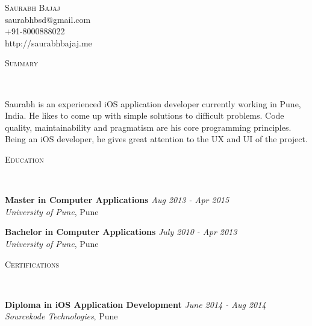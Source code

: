 \documentclass[9pt]{article}
\newenvironment{changemargin}[2]{%
  \begin{list}{}{%
    \setlength{\topsep}{0pt}%
    \setlength{\leftmargin}{#1}%
    \setlength{\rightmargin}{#2}%
    \setlength{\listparindent}{\parindent}%
    \setlength{\itemindent}{\parindent}%
    \setlength{\parsep}{\parskip}%
  }%
  \item[]}{\end{list}
}
\newcommand{\lineover}{
    \begin{changemargin}{-0.05in}{-0.05in}
        \vspace*{-8pt}
        \hrulefill \\
        \vspace*{-2pt}
    \end{changemargin}
}
\newcommand{\header}[1]{
    \begin{changemargin}{-0.5in}{-0.5in}
        \scshape{#1}\\
    \lineover
    \end{changemargin}
}
\newcommand{\contact}[4]{
    \begin{changemargin}{-0.5in}{-0.5in}
        \begin{center}
            {\Large \scshape {#1}}\\ \smallskip
            {#2}\\ \smallskip
            {#3}\\ \smallskip
            {#4}\smallskip
        \end{center}
    \end{changemargin}
}
\newenvironment{body} {
    \vspace*{-16pt}
    \begin{changemargin}{-0.25in}{-0.5in}
  }
    {\end{changemargin}
}
\begin{document}
\contact{Saurabh Bajaj}{saurabhbsd@gmail.com}{+91-8000888022}{http://saurabhbajaj.me}


\header{Summary}

\begin{body}
    \vspace{14pt}
  Saurabh is an experienced iOS application developer currently working in Pune, India. 
  He likes to come up with simple solutions to difficult problems. 
  Code quality, maintainability and pragmatism are his core programming principles.
  Being an iOS developer, he gives great attention to the UX and UI of the project.

\end{body}

\smallskip


\header{Education}

\begin{body}
    \vspace{14pt}
    \textbf{Master in Computer Applications}{} \hfill \emph{Aug 2013 - Apr 2015}{} \\
    \emph{University of Pune}, Pune{} \\
\end{body}

\begin{body}
    \vspace{14pt}
    \textbf{Bachelor in Computer Applications}{} \hfill \emph{July 2010 - Apr 2013}{} \\
    \emph{University of Pune}, Pune{} \\
\end{body}

\smallskip


\header{Certifications}

\begin{body}
    \vspace{14pt}
    \textbf{Diploma in iOS Application Development}{} \hfill \emph{June 2014 - Aug 2014}{} \\
    \emph{Sourcekode Technologies}, Pune{} \\
\end{body}

\smallskip
\end{document}
